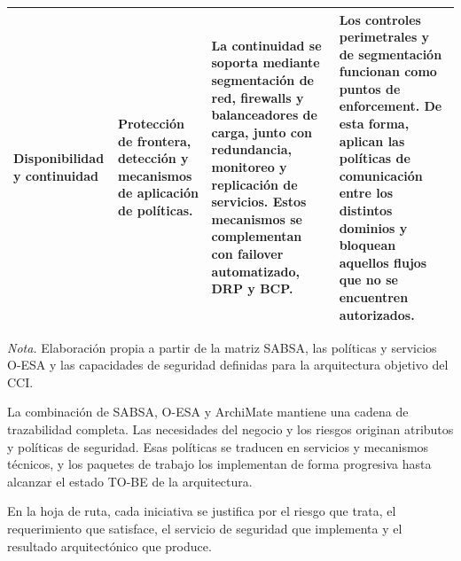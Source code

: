\begin{table}[H]
\begin{tabularx}{\textwidth}{
			>{\raggedright\arraybackslash}p{2.2cm}
			>{\raggedright\arraybackslash}p{2.6cm}
			>{\raggedright\arraybackslash}X
			>{\raggedright\arraybackslash}X}
		\addlinespace

		Disponibilidad y continuidad                                                       &
		Protección de frontera, detección y mecanismos de aplicación de políticas.         &
		La continuidad se soporta mediante segmentación de red, firewalls y balanceadores de
		carga, junto con redundancia, monitoreo y replicación de servicios. Estos mecanismos se
		complementan con failover automatizado, DRP y BCP.                                 &
		Los controles perimetrales y de segmentación funcionan como puntos de enforcement.
		De esta forma, aplican las políticas de comunicación entre los distintos dominios y
		bloquean aquellos flujos que no se encuentren autorizados.                           \\

		\bottomrule
	\end{tabularx}

	\begin{minipage}{0.96\textwidth}
		\footnotesize
		\textit{Nota.} Elaboración propia a partir de la matriz SABSA, las políticas y servicios
		O-ESA \parencite{sabsa2005,sabsaCCI2026,oesa2011,oesaCCI2026} y las capacidades de seguridad definidas para la arquitectura objetivo del CCI.
	\end{minipage}
\end{table}

La combinación de SABSA, O-ESA y ArchiMate \parencite{sabsaCCI2026,oesaCCI2026,modeloArchimateCCI2026} mantiene una cadena de trazabilidad completa. Las
necesidades del negocio y los riesgos originan atributos y políticas de seguridad. Esas políticas
se traducen en servicios y mecanismos técnicos, y los paquetes de trabajo los implementan de
forma progresiva hasta alcanzar el estado TO-BE de la arquitectura.

En la hoja de ruta, cada iniciativa se justifica por el riesgo que trata, el requerimiento que
satisface, el servicio de seguridad que implementa y el resultado arquitectónico que produce.


